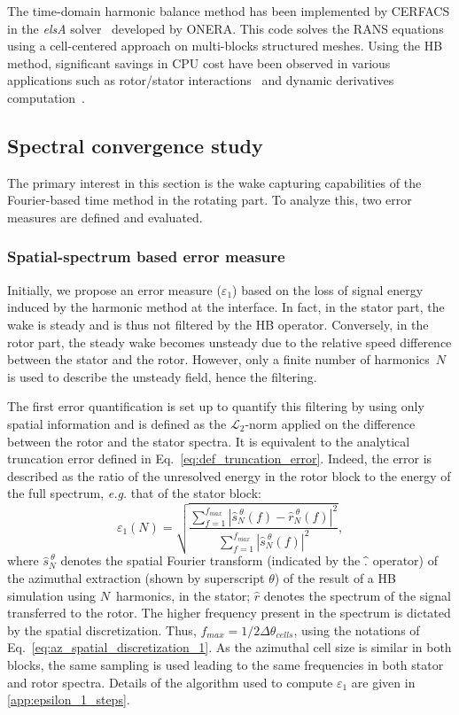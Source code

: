 The time-domain harmonic balance method has been implemented 
by CERFACS in the
\emph{elsA} solver~\cite{Cambier2013} developed by ONERA. 
This code solves the RANS equations using a cell-centered
approach on multi-blocks structured meshes.  Using the HB method,
significant savings in CPU cost have been observed in various
applications such as rotor/stator interactions~\cite{JSicot2012}
and dynamic derivatives computation~\cite{CIHassan2011}. 


\subsection{Spectral convergence study}
The primary interest in this section is the wake capturing capabilities of the 
Fourier-based time method in the rotating part. 
To analyze this, two error measures are defined and
evaluated. 

\subsubsection{Spatial-spectrum based error measure}
\label{sec:crit_1}
Initially, we propose an error measure ($\varepsilon_1$) based 
on the loss of signal energy
induced by the harmonic method at the interface. 
In fact, in the stator part, the wake is steady and is thus not
filtered by the HB operator. 
Conversely, in the rotor part, the steady wake becomes
unsteady due to the relative speed difference between the
stator and the rotor. However, only a finite number of harmonics~$N$
is used to describe the unsteady field, hence the filtering.

The first error quantification is set up to quantify this filtering 
by using only spatial information and is defined as the $\mathcal{L}_2$-norm 
applied on the 
difference between the rotor and the stator spectra.
It is equivalent to the analytical truncation error 
defined in Eq.~\eqref{eq:def_truncation_error}. 
Indeed, the error is described as the ratio of the unresolved energy 
in the rotor block
to the energy of the full spectrum, 
\emph{e.g.} that of the stator block:
\begin{equation}
    \varepsilon_1(N) = \sqrt{
    \frac{\sum_{f=1}^{f_{max}} | \widehat{s}^{~\theta}_N (f) - 
      \widehat{r}^{~\theta}_N (f)|^2}{ 
    \sum_{f=1}^{f_{max}} | \widehat{s}^{~\theta}_N (f)|^2}},
    \label{eq:def_crit_1}
\end{equation} 
where $\widehat{s}^{~\theta}_N$ denotes the spatial Fourier transform (indicated by
the $\widehat{\vphantom{s}.}$ operator) of the azimuthal extraction (shown
by superscript $\theta$) of the result of a HB simulation using $N$~harmonics,
in the stator; $\widehat{r}$ denotes the spectrum of 
the signal transferred to the rotor.
The higher frequency present in the spectrum is dictated 
by the spatial discretization. Thus, $f_{max} = 1 / 2\Delta \theta_{cells}$, 
using the notations of Eq.~\eqref{eq:az_spatial_discretization_1}.
As the azimuthal cell size is similar in both blocks, 
the same sampling is used leading to the same 
frequencies in both stator and rotor spectra.
Details of the algorithm used to compute $\varepsilon_1$ 
are given in \ref{app:epsilon_1_steps}.

